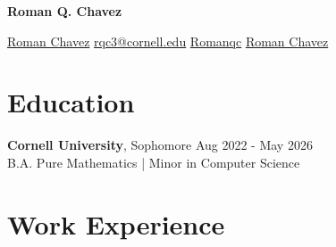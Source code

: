 \documentclass[letterpaper, 10pt]{article}
\newcommand{\iconSpace}{\hspace{2px}}
\newcommand{\secStartSpace}{\vspace{3pt}}
\newcommand{\secEndSpace}{\vspace{5pt}}
\begin{document}
\noindent \hspace{-4pt} 
\begin{center} {\Large \textbf{Roman Q. Chavez}}
\vspace{5pt}
\color{TextColor}

    \noindent
    \color{black}
         \iconSpace \href{https://www.linkedin.com/in/romanqchavez//}{Roman Chavez} \hspace{2pt}
         \iconSpace \href{mailto:rqc3@cornell.edu}{rqc3@cornell.edu} \hspace{2pt}
         \iconSpace \href{https://github.com/romanqc}{Romanqc} \hspace{2pt}
         \iconSpace \href{https://youtube.com/@romanqc?si=kCd1-Ca1zh4sKMBL}{Roman Chavez} \hspace{2pt} \\
\vspace{5pt}
\end{center}


\vspace{-5pt}
\section{ \color{black} \hspace{-8pt} \large \textbf{Education} }

\secStartSpace
\noindent \normalsize \textbf{Cornell University}, Sophomore \hfill \normalsize{Aug 2022 - May 2026} \\
\setlength \parindent{1cm} B.A. Pure Mathematics | Minor in Computer Science \\
\secEndSpace

\vspace{-5pt}

\vspace{-5pt}
\section{ \color{black} \hspace{-8pt} \large \textbf{Work Experience} }
\end{document}
